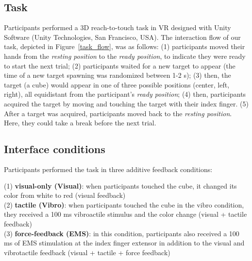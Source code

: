 \subsection{Task}
Participants performed a 3D reach-to-touch task in VR designed with Unity Software (Unity Technologies, San Francisco, USA). The interaction flow of our task, depicted in Figure~\ref{task_flow}, was as follows: (1) participants moved their hands from the \textit{resting position} to the \textit{ready position}, to indicate they were ready to start the next trial; (2) participants waited for a new target to appear (the time of a new target spawning was randomized between 1-2 s); (3) then, the target (a cube) would appear in one of three possible positions (center, left, right), all equidistant from the participant's \textit{ready position}; (4) then, participants acquired the target by moving and touching the target with their index finger. (5) After a target was acquired, participants moved back to the \textit{resting position}. Here, they could take a break before the next trial.

\subsection{Interface conditions}
Participants performed the task in three additive feedback conditions:

(1) \textbf{visual-only (Visual)}: when participants touched the cube, it changed its color from white to red (visual feedback)\\
\indent(2) \textbf{tactile (Vibro)}: when participants touched the cube in the vibro condition, they received a 100 ms vibroactile stimulus and the color change (visual + tactile feedback)\\
\indent(3) \textbf{force-feedback (EMS)}: in this condition, participants also received a 100 ms of EMS stimulation at the index finger extensor in addition to the visual and vibrotactile feedback (visual + tactile + force feedback)


